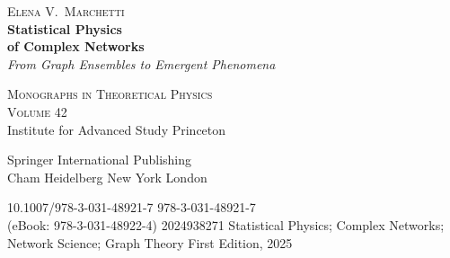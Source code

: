 \documentclass[a4paper,twoside,11pt]{book}
\begin{document}
\thispagestyle{empty}
\begin{titlepage}
  \vspace*{30mm}

  {\large\scshape\color{accent!80!black} Elena V.\ Marchetti}\\[6mm]

  {\Huge\bfseries\color{accent} Statistical Physics\\[4pt] of Complex Networks}\\[8mm]

  {\Large\itshape\color{accent!70!black} From Graph Ensembles to Emergent Phenomena}\\[16mm]

  \decorule

  \vspace{16mm}

  {\large\scshape\color{accent!70!black} Monographs in Theoretical Physics\\[4pt] Volume 42}\\[20mm]

  {\normalsize\color{textdark!70!black}
  Institute for Advanced Study \quad\textbullet\quad Princeton}\\[20mm]

  \vfill

  {\normalsize\color{accent!60!black} Springer International Publishing\\
  Cham \textbullet{} Heidelberg \textbullet{} New York \textbullet{} London}

  \vspace{14mm}

  \metadatablock
    {10.1007/978-3-031-48921-7}
    {978-3-031-48921-7\\ (eBook: 978-3-031-48922-4)}
    {2024938271}
    {Statistical Physics; Complex Networks; Network Science; Graph Theory}
    {First Edition, 2025}
\end{titlepage}

\newpage
\thispagestyle{empty}
\vspace*{50mm}
\end{document}
